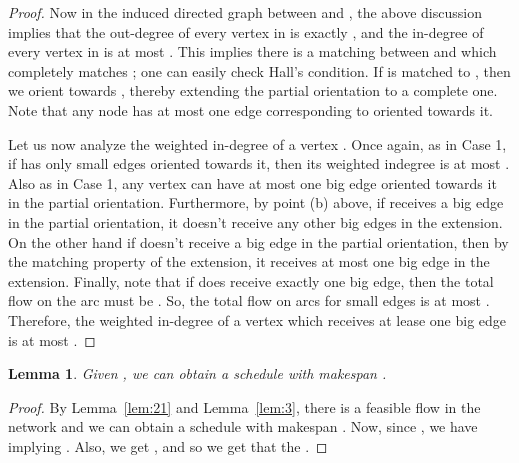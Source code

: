 \documentclass[11pt]{article}
\newtheorem{lemma}{Lemma}
\begin{document}
\begin{proof}
	Now in the induced directed graph between  and , the above discussion implies that the out-degree of every vertex in  is exactly , and the in-degree of every vertex in  is at most .
	This implies there is a matching between  and  which completely matches ; one can easily check Hall's condition. If  is matched to , then we orient  towards , thereby extending the partial orientation to a complete one. Note that any node  has at most one edge corresponding to  oriented towards it.
	
	Let us now analyze the weighted in-degree of a vertex . Once again, as in Case 1, if  has only small edges oriented towards it, then its weighted indegree is at most .
	Also as in Case 1, any vertex  can have at most one big edge oriented towards it in the partial orientation. 
Furthermore, by point (b) above, if  receives a big edge in the partial orientation, it doesn't receive any other big edges in the extension.
    On the other hand if  doesn't receive a big edge in the partial orientation, then by the matching property of the extension, it receives at most one big edge in the extension.
    Finally, note that if  does receive exactly one big edge, then the total flow on the  arc must be . So, the total flow on arcs  for small edges  is at most . Therefore, the weighted in-degree of a vertex  which receives at lease one big edge is at most .
\end{proof}


\begin{lemma}\label{lem:41}
	Given , we can obtain a schedule with makespan .
\end{lemma}
\begin{proof}
By Lemma~\ref{lem:21} and Lemma~\ref{lem:3}, there is a feasible flow in the network  and we can obtain a schedule with makespan .
Now, since , we have  implying .
Also, we get , and so we get that the .
\end{proof}
\end{document}
